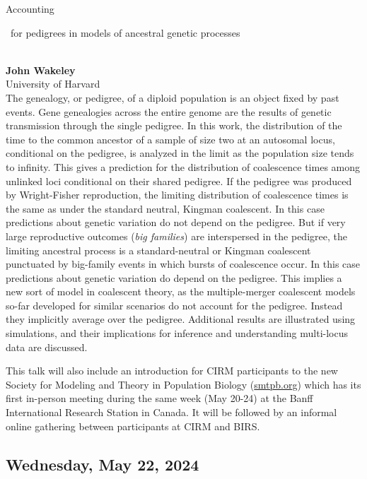 \documentclass[12pt,a4paper]{article}
\newcommand{\ZAbst}{\rule[-1ex]{0pt}{2ex}\ } %
\begin{document}
\enlargethispage{1cm}
{\Large  
Accounting\ZAbst for pedigrees in models of ancestral genetic processes}\\[1ex]
{\large 
\textbf{John Wakeley}\\[1ex] University of Harvard}\\[2ex]
The genealogy, or pedigree, of a diploid population is an object fixed by past events. Gene genealogies across the entire genome are the results of genetic transmission through the single pedigree. In this work, the distribution of the time to the common ancestor of a sample of size two at an autosomal locus, conditional on the pedigree, is analyzed in the limit as the population size tends to infinity. This gives a prediction for the distribution of coalescence times among unlinked loci conditional on their shared pedigree. If the pedigree was produced by Wright-Fisher reproduction, the limiting distribution of coalescence times is the same as under the standard neutral, Kingman coalescent. In this case predictions about genetic variation do not depend on the pedigree. But if very large reproductive outcomes ({\em big families}) are interspersed in the pedigree, the limiting ancestral process is a standard-neutral or Kingman coalescent punctuated by big-family events in which bursts of coalescence occur. In this case predictions about genetic variation do depend on the pedigree. This implies a new sort of model in coalescent theory, as the multiple-merger coalescent models so-far developed for similar scenarios do not account for the pedigree. Instead they implicitly average over the pedigree. Additional results are illustrated using simulations, and their implications for inference and understanding multi-locus data are discussed. 

This talk will also include an introduction for CIRM participants to the new Society for Modeling and Theory in Population Biology (\url{smtpb.org}) which has its first in-person meeting during the same week (May 20-24) at the Banff International Research Station in Canada. It will be followed by an informal online gathering between participants at CIRM and BIRS.  

\newpage
\subsection*{\sffamily Wednesday, May 22, 2024}

\end{document}
